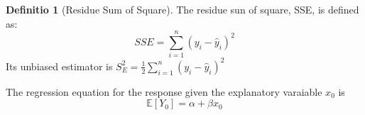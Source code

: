\documentclass[12pt, a4paper]{article}
\theoremstyle{definition}
\newtheorem{definition}{Definitio}[section]
\theoremstyle{remark}
\newcommand{\bb}[1]{\mathbb{#1}}
\begin{document}
\begin{definition}[Residue Sum of Square]
	The residue sun of square, SSE, is defined as:
	\begin{equation}
		SSE=\sum^{n}_{i=1}(y_i-\hat{y}_i)^2
	\end{equation}
	Its unbiased estimator is $S^2_E = \frac{1}{2}\sum^{n}_{i=1}(y_i-\hat{y}_i)^2$
\end{definition}

The regression equation for the response given the explanatory varaiable $x_0$ is
\begin{equation}
	\bb{E}[Y_0]=\alpha + \beta x_0
\end{equation}
\end{document}
